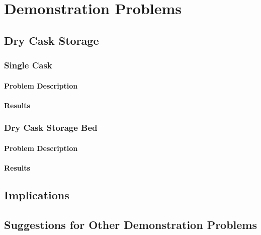\chapter{Demonstration Problems}

\section{Dry Cask Storage}
\subsection{Single Cask}
\subsubsection{Problem Description}
\subsubsection{Results}
\subsection{Dry Cask Storage Bed}
\subsubsection{Problem Description}
\subsubsection{Results}
\section{Implications}
\section{Suggestions for Other Demonstration Problems}

